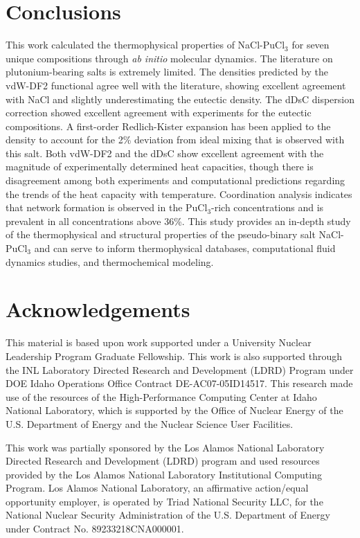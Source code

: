\documentclass[review]{elsarticle}
\begin{document}
\FloatBarrier

\section{Conclusions}
This work calculated the thermophysical properties of NaCl-PuCl$_3$ for seven unique compositions through \textit{ab initio} molecular dynamics. The literature on plutonium-bearing salts is extremely limited. The densities predicted by the vdW-DF2 functional agree well with the literature, showing excellent agreement with NaCl and slightly underestimating the eutectic density. The dDsC dispersion correction showed excellent agreement with experiments for the eutectic compositions. A first-order Redlich-Kister expansion has been applied to the density to account for the 2\% deviation from ideal mixing that is observed with this salt. Both vdW-DF2 and the dDsC show excellent agreement with the magnitude of experimentally determined heat capacities, though there is disagreement among both experiments and computational predictions regarding the trends of the heat capacity with temperature. Coordination analysis indicates that network formation is observed in the PuCl$_3$-rich concentrations and is prevalent in all concentrations above 36\%. This study provides an in-depth study of the thermophysical and structural properties of the pseudo-binary salt NaCl-PuCl$_3$ and can serve to inform thermophysical databases, computational fluid dynamics studies, and thermochemical modeling.

\section{Acknowledgements} 

This material is based upon work supported under a University Nuclear Leadership Program Graduate Fellowship. This work is also supported through the INL Laboratory Directed Research and Development (LDRD) Program under DOE Idaho Operations Office Contract DE-AC07-05ID14517. This research made use of the resources of the High-Performance Computing Center at Idaho National Laboratory, which is supported by the Office of Nuclear Energy of the U.S. Department of Energy and the Nuclear Science User Facilities.  

This work was partially sponsored by the Los Alamos National Laboratory Directed Research and Development (LDRD) program and used resources provided by the Los Alamos National Laboratory Institutional Computing Program. Los Alamos National Laboratory, an affirmative action/equal opportunity employer, is operated by Triad National Security LLC, for the National Nuclear Security Administration of the U.S. Department of Energy under Contract No. 89233218CNA000001.

\FloatBarrier



\end{document}

